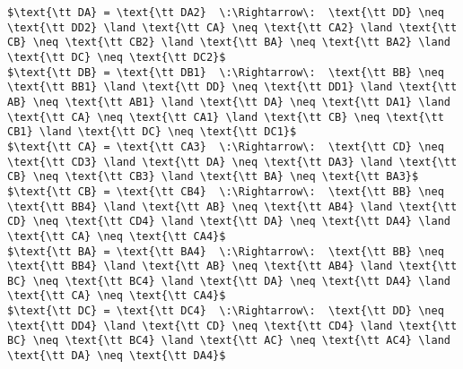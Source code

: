 \begin{lstlisting}[mathescape=true, caption=Output]
$\text{\tt DA} = \text{\tt DA2}  \:\Rightarrow\:  \text{\tt DD} \neq \text{\tt DD2} \land \text{\tt CA} \neq \text{\tt CA2} \land \text{\tt CB} \neq \text{\tt CB2} \land \text{\tt BA} \neq \text{\tt BA2} \land \text{\tt DC} \neq \text{\tt DC2}$
$\text{\tt DB} = \text{\tt DB1}  \:\Rightarrow\:  \text{\tt BB} \neq \text{\tt BB1} \land \text{\tt DD} \neq \text{\tt DD1} \land \text{\tt AB} \neq \text{\tt AB1} \land \text{\tt DA} \neq \text{\tt DA1} \land \text{\tt CA} \neq \text{\tt CA1} \land \text{\tt CB} \neq \text{\tt CB1} \land \text{\tt DC} \neq \text{\tt DC1}$
$\text{\tt CA} = \text{\tt CA3}  \:\Rightarrow\:  \text{\tt CD} \neq \text{\tt CD3} \land \text{\tt DA} \neq \text{\tt DA3} \land \text{\tt CB} \neq \text{\tt CB3} \land \text{\tt BA} \neq \text{\tt BA3}$
$\text{\tt CB} = \text{\tt CB4}  \:\Rightarrow\:  \text{\tt BB} \neq \text{\tt BB4} \land \text{\tt AB} \neq \text{\tt AB4} \land \text{\tt CD} \neq \text{\tt CD4} \land \text{\tt DA} \neq \text{\tt DA4} \land \text{\tt CA} \neq \text{\tt CA4}$
$\text{\tt BA} = \text{\tt BA4}  \:\Rightarrow\:  \text{\tt BB} \neq \text{\tt BB4} \land \text{\tt AB} \neq \text{\tt AB4} \land \text{\tt BC} \neq \text{\tt BC4} \land \text{\tt DA} \neq \text{\tt DA4} \land \text{\tt CA} \neq \text{\tt CA4}$
$\text{\tt DC} = \text{\tt DC4}  \:\Rightarrow\:  \text{\tt DD} \neq \text{\tt DD4} \land \text{\tt CD} \neq \text{\tt CD4} \land \text{\tt BC} \neq \text{\tt BC4} \land \text{\tt AC} \neq \text{\tt AC4} \land \text{\tt DA} \neq \text{\tt DA4}$
\end{lstlisting}
